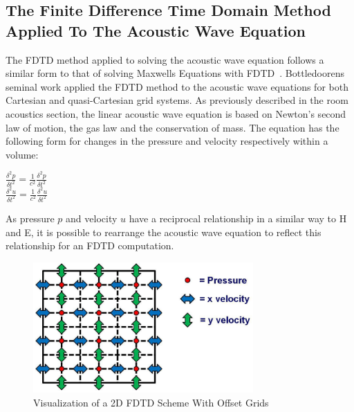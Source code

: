 \subsection{The Finite Difference Time Domain Method Applied To The Acoustic Wave Equation}
The FDTD method applied to solving the acoustic wave equation follows a similar form to that of solving Maxwells Equations with FDTD~\cite{Schneider2015}. Bottledoorens~\cite{Botteldooren1993} seminal work applied the FDTD method to the acoustic wave equations for both Cartesian and quasi-Cartesian grid systems. As previously described in the room acoustics section, the linear acoustic wave equation is based on Newton's second law of motion, the gas law and the conservation of mass. The equation has the following form for changes in the pressure and velocity respectively within a volume:\\
\begin{center}
$\frac{\delta^2 p}{\delta t^2} = \frac{1}{c^2} \frac{\delta^2 p}{\delta t^2}$\\
$\frac{\delta^2 u}{\delta t^2} = \frac{1}{c^2} \frac{\delta^2 u}{\delta t^2}$\\
\end{center}
As pressure $p$ and velocity $u$ have a reciprocal relationship in a similar way to H and E, it is possible to rearrange the acoustic wave equation to reflect this relationship for an FDTD computation.

\begin{figure}[H]
\centering
  \includegraphics[width=0.75\textwidth]{./graphics/fdtd2dstencil.png}
  \caption{Visualization of a 2D FDTD Scheme With Offset Grids~\cite{Hill2012}}
\end{figure}

